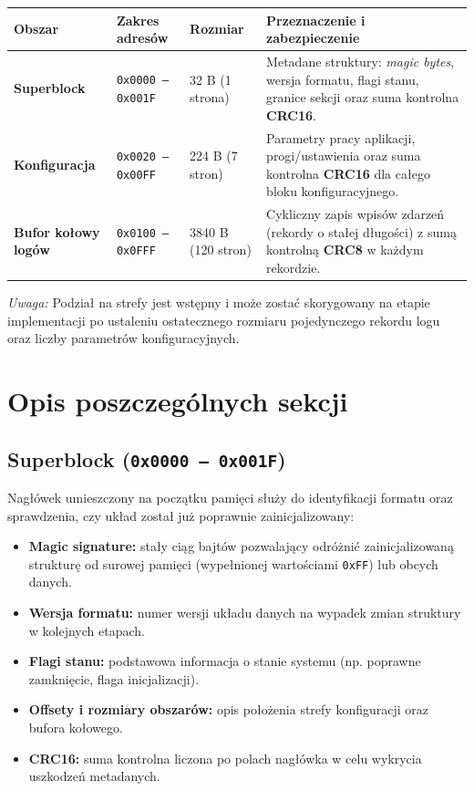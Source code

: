 \documentclass[11pt, a4paper]{article}
\begin{document}
\vspace{0.3cm}
\noindent
\begin{tabularx}{\textwidth}{@{} l l l X @{}}
\toprule
\textbf{Obszar} & \textbf{Zakres adresów} & \textbf{Rozmiar} & \textbf{Przeznaczenie i zabezpieczenie} \\
\midrule
\textbf{Superblock} & \texttt{0x0000 -- 0x001F} & 32 B (1 strona) & Metadane struktury: \textit{magic bytes}, wersja formatu, flagi stanu, granice sekcji oraz suma kontrolna \textbf{CRC16}. \\
\addlinespace
\textbf{Konfiguracja} & \texttt{0x0020 -- 0x00FF} & 224 B (7 stron) & Parametry pracy aplikacji, progi/ustawienia oraz suma kontrolna \textbf{CRC16} dla całego bloku konfiguracyjnego. \\
\addlinespace
\textbf{Bufor kołowy logów} & \texttt{0x0100 -- 0x0FFF} & 3840 B (120 stron) & Cykliczny zapis wpisów zdarzeń (rekordy o stałej długości) z sumą kontrolną \textbf{CRC8} w każdym rekordzie. \\
\bottomrule
\end{tabularx}
\vspace{0.3cm}

\noindent
\textit{Uwaga:} Podział na strefy jest wstępny i może zostać skorygowany na etapie implementacji po ustaleniu ostatecznego rozmiaru pojedynczego rekordu logu oraz liczby parametrów konfiguracyjnych.

\section{Opis poszczególnych sekcji}

\subsection{Superblock (\texttt{0x0000 -- 0x001F})}
Nagłówek umieszczony na początku pamięci służy do identyfikacji formatu oraz sprawdzenia, czy układ został już poprawnie zainicjalizowany:
\begin{itemize}
    \item \textbf{Magic signature:} stały ciąg bajtów pozwalający odróżnić zainicjalizowaną strukturę od surowej pamięci (wypełnionej wartościami \texttt{0xFF}) lub obcych danych.
    \item \textbf{Wersja formatu:} numer wersji układu danych na wypadek zmian struktury w kolejnych etapach.
    \item \textbf{Flagi stanu:} podstawowa informacja o stanie systemu (np. poprawne zamknięcie, flaga inicjalizacji).
    \item \textbf{Offsety i rozmiary obszarów:} opis położenia strefy konfiguracji oraz bufora kołowego.
    \item \textbf{CRC16:} suma kontrolna liczona po polach nagłówka w celu wykrycia uszkodzeń metadanych.
\end{itemize}
\end{document}

